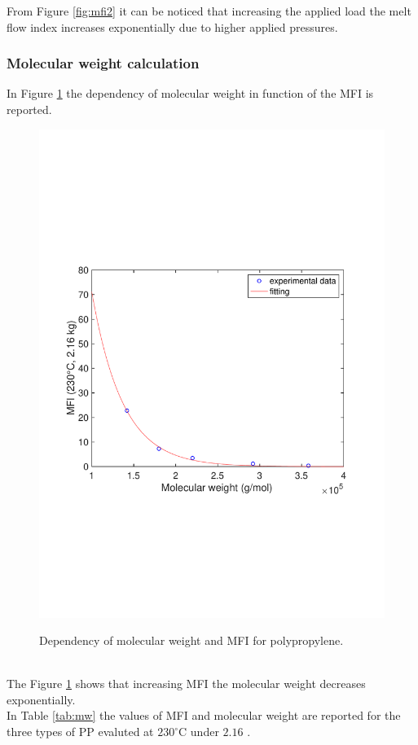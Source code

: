 \documentclass[a4paper, 11pt]{article}
\begin{document}
From Figure \ref{fig:mfi2} it can be noticed that increasing the applied load the melt flow index increases exponentially due to higher applied pressures.

\subsubsection{Molecular weight calculation}

In Figure \ref{fig:mw} the dependency of molecular weight in function of the MFI is reported.
\begin{figure}[h!]
	\centering
	{\includegraphics[scale=0.4]{mw}}
	\captionsetup{justification=centering}
	\caption{Dependency of molecular weight and MFI for polypropylene.}
	\label{fig:mw}
\end{figure}\\
The Figure \ref{fig:mw} shows that increasing MFI the molecular weight decreases exponentially.\\ In Table \ref{tab:mw} the values of MFI and molecular weight are reported for the three types of PP evaluted at $230 ^\circ$C under $2.16$ .
\end{document}
